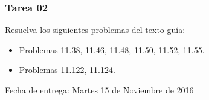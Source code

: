 \documentclass[ 10pt, xcolor = dvipsnames]{beamer}
\newcommand{\tsup}[1]{\ensuremath{^{\text{#1}}}}
\begin{document}
%
%
%
%

\begin{frame}[allowframebreaks]
\frametitle{Tarea 02}

Resuelva los siguientes problemas del texto gu\'ia: 
\begin{itemize}
\item Problemas 11.38, 11.46, 11.48, 11.50, 11.52, 11.55. 
\item Problemas 11.122, 11.124. 
\end{itemize}
Fecha de entrega: Martes 15 de Noviembre de 2016

\end{frame}
\end{document}
